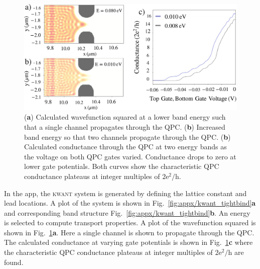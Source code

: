 \begin{figure}[!bht]
 \begin{center}
 \includegraphics[width=1.0\textwidth]{figures/appendix/appendix2_wavefunction.pdf}
 \caption[\textsc{kwant} : Transport properties]{\label{fig:appx/kwant_transport} 
 (\textbf{a}) Calculated wavefunction squared at a lower band energy such that a single channel propagates through the QPC. (\textbf{b}) Increased band energy so that two channels propagate through the QPC. (\textbf{b}) Calculated conductance through the QPC at two energy bands as the voltage on both QPC gates varied. Conductance drops to zero at lower gate potentials. Both curves show the characteristic QPC conductance plateaus at integer multiples of $\mathrm{2e^2/h}$.  }
 \end{center}
\end{figure}


In the app, the \textsc{kwant} system is generated by defining the lattice constant and lead locations. A plot of the system is shown in Fig.~\ref{fig:appx/kwant_tightbind}\textbf{a} and corresponding band structure Fig.~\ref{fig:appx/kwant_tightbind}\textbf{b}. An energy is selected to compute transport properties.
A plot of the wavefunction squared is shown in Fig.~\ref{fig:appx/kwant_transport}\textbf{a}. Here a single channel is shown to propagate through the QPC. 
The calculated conductance at varying gate potentials is shown in Fig.~\ref{fig:appx/kwant_transport}\textbf{c} where the characteristic QPC conductance plateaus at integer multiples of $\mathrm{2e^2/h}$ are found. 



